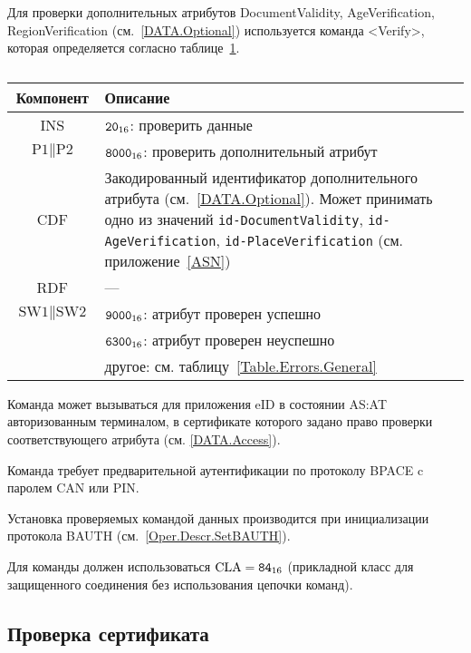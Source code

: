 Для проверки дополнительных 
атрибутов DocumentValidity, AgeVerification, RegionVerification 
(см.~\ref{DATA.Optional}) 
используется команда  <Verify>, 
которая определяется согласно 
таблице~\ref{Table.Oper.VerifyDataCmd}.

\begin{table}[hbt]
\caption{}\label{Table.Oper.VerifyDataCmd}
\begin{tabular}{|c|p{14cm}|}
\hline
Компонент & Описание \\
\hline
\hline
INS & $\texttt{20}_{16}$: проверить данные\\
\hline
$\text{P1} \parallel \text{P2}$ & $\texttt{8000}_{16}$: 
проверить дополнительный атрибут\\
\hline
CDF & Закодированный идентификатор дополнительного атрибута 
(см.~\ref{DATA.Optional}). 
Может принимать одно из значений 
\verb|id-DocumentValidity|, \verb|id-AgeVerification|, \verb|id-PlaceVerification| 
(см. приложение~\ref{ASN})\\
\hline 
RDF &  --- \\
\hline
$\text{SW1} \parallel \text{SW2}$ & $\texttt{9000}_{16}$: атрибут проверен успешно\\
 & $\texttt{6300}_{16}$: атрибут проверен неуспешно\\
 & другое: см. таблицу~\ref{Table.Errors.General} \\
\hline
\end{tabular}
\end{table}

Команда может вызываться для приложения eID в состоянии AS:AT
авторизованным терминалом, в сертификате которого задано право
проверки соответствующего атрибута (см. \ref{DATA.Access}).  

Команда требует предварительной аутентификации по протоколу BPACE 
c паролем CAN или PIN.

Установка проверяемых командой данных производится 
при инициализации протокола BAUTH (см.~\ref{Oper.Descr.SetBAUTH}).  

Для команды должен использоваться $\text{CLA}=\texttt{84}_{16}$ 
(прикладной класс для защищенного соединения без использования цепочки 
команд). 




\subsection{Проверка сертификата}
\label{Oper.Descr.VerifyCert}

